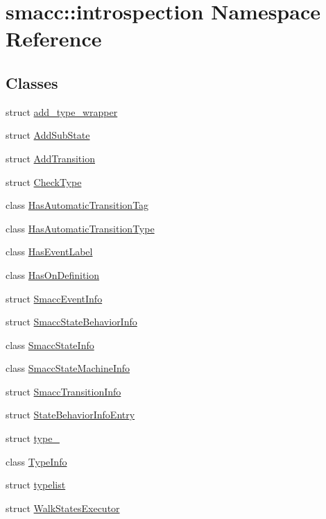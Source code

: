 \hypertarget{namespacesmacc_1_1introspection}{}\section{smacc\+:\+:introspection Namespace Reference}
\label{namespacesmacc_1_1introspection}
\subsection*{Classes}
\begin{DoxyCompactItemize}
\item 
struct \hyperlink{structsmacc_1_1introspection_1_1add__type__wrapper}{add\+\_\+type\+\_\+wrapper}
\item 
struct \hyperlink{structsmacc_1_1introspection_1_1AddSubState}{Add\+Sub\+State}
\item 
struct \hyperlink{structsmacc_1_1introspection_1_1AddTransition}{Add\+Transition}
\item 
struct \hyperlink{structsmacc_1_1introspection_1_1CheckType}{Check\+Type}
\item 
class \hyperlink{classsmacc_1_1introspection_1_1HasAutomaticTransitionTag}{Has\+Automatic\+Transition\+Tag}
\item 
class \hyperlink{classsmacc_1_1introspection_1_1HasAutomaticTransitionType}{Has\+Automatic\+Transition\+Type}
\item 
class \hyperlink{classsmacc_1_1introspection_1_1HasEventLabel}{Has\+Event\+Label}
\item 
class \hyperlink{classsmacc_1_1introspection_1_1HasOnDefinition}{Has\+On\+Definition}
\item 
struct \hyperlink{structsmacc_1_1introspection_1_1SmaccEventInfo}{Smacc\+Event\+Info}
\item 
struct \hyperlink{structsmacc_1_1introspection_1_1SmaccStateBehaviorInfo}{Smacc\+State\+Behavior\+Info}
\item 
class \hyperlink{classsmacc_1_1introspection_1_1SmaccStateInfo}{Smacc\+State\+Info}
\item 
class \hyperlink{classsmacc_1_1introspection_1_1SmaccStateMachineInfo}{Smacc\+State\+Machine\+Info}
\item 
struct \hyperlink{structsmacc_1_1introspection_1_1SmaccTransitionInfo}{Smacc\+Transition\+Info}
\item 
struct \hyperlink{structsmacc_1_1introspection_1_1StateBehaviorInfoEntry}{State\+Behavior\+Info\+Entry}
\item 
struct \hyperlink{structsmacc_1_1introspection_1_1type__}{type\+\_\+}
\item 
class \hyperlink{classsmacc_1_1introspection_1_1TypeInfo}{Type\+Info}
\item 
struct \hyperlink{structsmacc_1_1introspection_1_1typelist}{typelist}
\item 
struct \hyperlink{structsmacc_1_1introspection_1_1WalkStatesExecutor}{Walk\+States\+Executor}
\end{DoxyCompactItemize}
